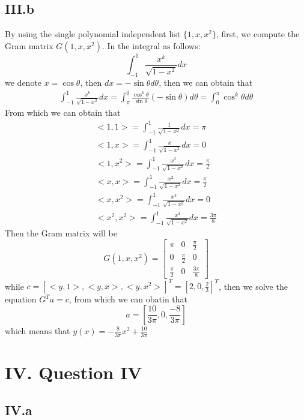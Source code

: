 \documentclass[a4paper]{article}
\begin{document}
\subsection*{III.b}
By using the single polynomial independent list $\{1,x,x^2\}$,
first, we compute the Gram matrix $G(1,x,x^2)$. In the integral as follows:
\begin{equation}
  \int_{-1}^1\frac{x^k}{\sqrt{1-x^2}}dx
\end{equation}
we denote $x=\cos \theta$, then $dx=-\sin \theta d\theta$, then we can obtain that
\begin{eqnarray}
  \int_{-1}^1\frac{x^k}{\sqrt{1-x^2}}dx=\int_{\pi}^0\frac{\cos^k\theta}{\sin\theta}(-\sin\theta)d \theta=\int_0^{\pi}\cos^k\theta d\theta
\end{eqnarray}
From which we can obtain that
\begin{align}
  <1,1>=\int_{-1}^1 \frac{1}{\sqrt{1-x^2}}dx=\pi\\
  <1,x>=\int_{-1}^1 \frac{x}{\sqrt{1-x^2}}dx=0\\
  <1,x^2>=\int_{-1}^1 \frac{x^2}{\sqrt{1-x^2}}dx=\frac{\pi}{2}\\
  <x,x>=\int_{-1}^1 \frac{x^2}{\sqrt{1-x^2}}dx=\frac{\pi}{2}\\
  <x,x^2>=\int_{-1}^1 \frac{x^3}{\sqrt{1-x^2}}dx=0\\
  <x^2,x^2>=\int_{-1}^1 \frac{x^4}{\sqrt{1-x^2}}dx=\frac{3\pi}{8}
\end{align}
Then the Gram matrix will be 
\begin{equation}
  G(1,x,x^2)=\begin{bmatrix}
    \pi & 0 & \frac{\pi}{2}\\
    0 & \frac{\pi}{2} &0\\
    \frac{\pi}{2} &0 & \frac{3\pi}{8}
  \end{bmatrix}
\end{equation}
while $c=[<y,1>,<y,x>,<y,x^2>]^T=[2,0,\frac{2}{3}]^T$, then we solve the equation $G^Ta=c$, from which we can obatin that 
\begin{equation}
  a=[\frac{10}{3\pi},0,\frac{-8}{3\pi}]
\end{equation}
which means that $y(x)=-\frac{8}{3\pi}x^2+\frac{10}{3\pi}$
\section*{IV. Question IV}

\subsection*{IV.a}
\end{document}
